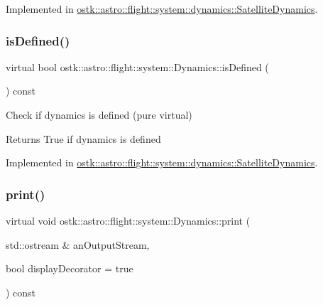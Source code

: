 Implemented in \hyperlink{classostk_1_1astro_1_1flight_1_1system_1_1dynamics_1_1_satellite_dynamics_aed9ddda1a1d1c4636e2c0d6ccc9d5a16}{ostk\+::astro\+::flight\+::system\+::dynamics\+::\+Satellite\+Dynamics}.

\mbox{\label{classostk_1_1astro_1_1flight_1_1system_1_1_dynamics_a13160e001990a6ce8db807e39b8f97df}} 
\subsubsection{\texorpdfstring{is\+Defined()}{isDefined()}}
{\footnotesize\ttfamily virtual bool ostk\+::astro\+::flight\+::system\+::\+Dynamics\+::is\+Defined (\begin{DoxyParamCaption}{ }\end{DoxyParamCaption}) const\hspace{0.3cm}{\ttfamily [pure virtual]}}



Check if dynamics is defined (pure virtual) 

\begin{DoxyReturn}{Returns}
True if dynamics is defined 
\end{DoxyReturn}


Implemented in \hyperlink{classostk_1_1astro_1_1flight_1_1system_1_1dynamics_1_1_satellite_dynamics_aa58384471ec8825964af48a4a2235fab}{ostk\+::astro\+::flight\+::system\+::dynamics\+::\+Satellite\+Dynamics}.

\mbox{\label{classostk_1_1astro_1_1flight_1_1system_1_1_dynamics_aa3fdfebb45a96bb0c6405c750e1c6d30}} 
\subsubsection{\texorpdfstring{print()}{print()}}
{\footnotesize\ttfamily virtual void ostk\+::astro\+::flight\+::system\+::\+Dynamics\+::print (\begin{DoxyParamCaption}\item[{std\+::ostream \&}]{an\+Output\+Stream,  }\item[{bool}]{display\+Decorator = {\ttfamily true} }\end{DoxyParamCaption}) const\hspace{0.3cm}{\ttfamily [pure virtual]}}



